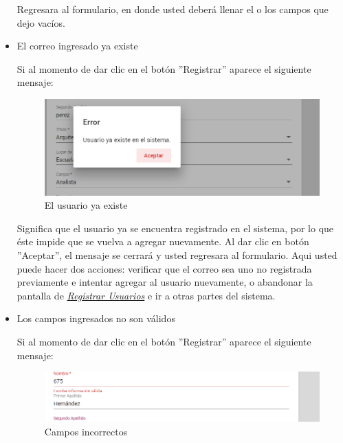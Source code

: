 \begin{itemize}
                         Regresara  al formulario, en donde usted deberá llenar el o los campos que dejo vacíos. 
                    
                    \item El correo ingresado ya existe
                
                        Si al momento de dar clic en el botón ''Registrar'' aparece el siguiente mensaje:
                        	
                         \begin{figure}[!hbtp]
                        	\centering
                        \includegraphics[width=0.4\linewidth]{images/SP5/MSG36}
                        	\caption{El usuario ya existe}
                        	\label{mensaje36}
                        
                        \end{figure}
                    
                        Significa que el usuario ya se encuentra registrado en el sistema, por lo que éste impide que se vuelva a agregar nuevamente. Al dar clic en botón ''Aceptar'', el mensaje se cerrará y usted regresara al formulario. Aqui usted puede hacer dos acciones: verificar que el correo sea uno no registrada previamente e intentar agregar al usuario nuevamente, o abandonar la pantalla de \hyperlink{registrarUs}{\textit{Registrar Usuarios}} e ir a otras partes del sistema.
                    \newpage
                    \item Los campos ingresados no son válidos
                
                        Si al momento de dar clic en el botón ''Registrar'' aparece el siguiente mensaje:
                         \begin{figure}[!hbtp]
                        	\centering
                        	\includegraphics[width=0.4\linewidth]{images/SP5/MSG35}
                        	\caption{Campos incorrectos}
                        	\label{mensaje35}
                        

\end{figure}
\end{itemize}
